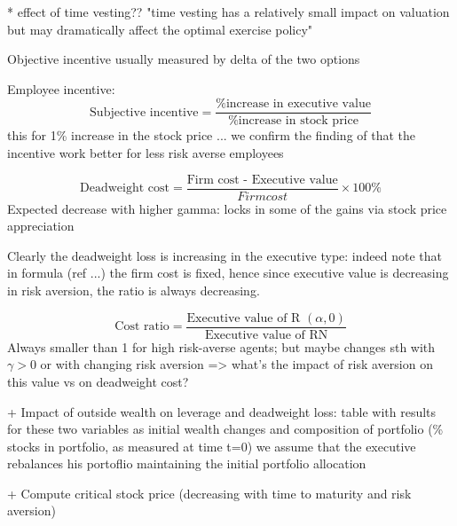 * effect of time vesting?? "time vesting has a relatively small impact on valuation but may dramatically affect the optimal exercise policy" \cite{dybvig2003employee}

Objective incentive usually measured by delta of the two options

Employee incentive: $$\text{Subjective incentive} = \frac{\text{\%  increase in executive value}}{\text{\% increase in stock price}} $$
    this for 1\% increase in the stock price
    ... we confirm the finding of \cite{lau2005valuation} that the incentive work better for less risk averse employees 

$$ \text{Deadweight cost} = \frac{\text{Firm cost - Executive value}}{Firm cost} \times 100\%  $$
    Expected decrease with higher gamma: locks in some of the gains via stock price appreciation

    Clearly the deadweight loss is increasing in the executive type: indeed note that in formula (ref ...)  the firm cost is fixed, hence since executive value is decreasing in risk aversion, the ratio is always decreasing.

$$\text{Cost ratio} = \frac{\text{Executive value of R }(\alpha, 0)}{\text{Executive value of RN}}$$
    Always smaller than 1 for high risk-averse agents; but maybe changes sth with $\gamma > 0$ or with changing risk aversion
    => what's the impact of risk aversion on this value vs on deadweight cost?


+ Impact of outside wealth on leverage and deadweight loss: table with results for these two variables as initial wealth changes and composition of portfolio (\% stocks in portfolio, as measured at time t=0)
    we assume that the executive rebalances his portoflio maintaining the initial portfolio allocation 

+ Compute critical stock price (decreasing with time to maturity and risk aversion)





